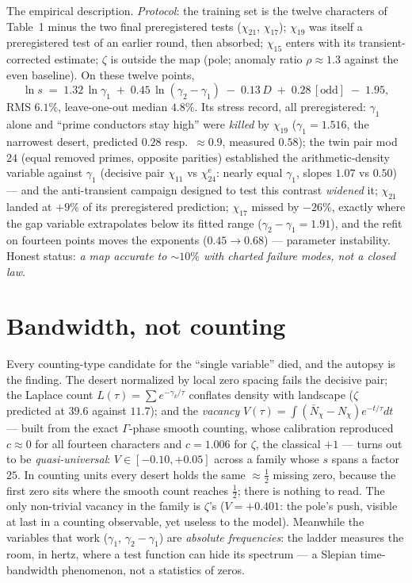 \documentclass[10pt]{article}
\begin{document}
The empirical description. \emph{Protocol}: the training set is the
twelve characters of Table~1 minus the two final preregistered tests
($\chi_{21}$, $\chi_{17}$); $\chi_{19}$ was itself a preregistered
test of an earlier round, then absorbed; $\chi_{15}$ enters with its
transient-corrected estimate; $\zeta$ is outside the map (pole;
anomaly ratio $\rho\approx1.3$ against the even baseline). On these
twelve points,
\[
\ln s \;=\; 1.32\,\ln\gamma_1 \;+\; 0.45\,\ln(\gamma_2-\gamma_1)
\;-\;0.13\,D\;+\;0.28\,[\text{odd}]\;-\;1.95,
\]
RMS $6.1\%$, leave-one-out median $4.8\%$. Its stress record, all
preregistered: $\gamma_1$ alone and ``prime conductors stay high'' were
\emph{killed} by $\chi_{19}$ ($\gamma_1=1.516$, the narrowest desert,
predicted $0.28$ resp.\ $\approx0.9$, measured $0.58$); the twin pair
mod $24$ (equal removed primes, opposite parities) established the
arithmetic-density variable against $\gamma_1$ (decisive pair
$\chi_{11}$ vs $\chi_{24}^{\mathrm e}$: nearly equal $\gamma_1$, slopes
$1.07$ vs $0.50$) --- and the anti-transient campaign designed to test
this contrast \emph{widened} it; $\chi_{21}$ landed at $+9\%$ of its
preregistered prediction; $\chi_{17}$ missed by $-26\%$, exactly where
the gap variable extrapolates below its fitted range
($\gamma_2-\gamma_1=1.91$), and the refit on fourteen points moves the
exponents ($0.45\to0.68$) --- parameter instability. Honest status:
\emph{a map accurate to $\sim\!10\%$ with charted failure modes, not a
closed law}.

\section{Bandwidth, not counting}

Every counting-type candidate for the ``single variable'' died, and the
autopsy is the finding. The desert normalized by local zero spacing
fails the decisive pair; the Laplace count $L(\tau)=\sum e^{-\gamma_k/\tau}$
conflates density with landscape ($\zeta$ predicted at $39.6$ against
$11.7$); and the \emph{vacancy} $V(\tau)=\int(\bar N_\chi-N_\chi)
e^{-t/\tau}dt$ --- built from the exact $\Gamma$-phase smooth counting,
whose calibration reproduced $c\approx0$ for all fourteen characters and
$c=1.006$ for $\zeta$, the classical $+1$ --- turns out to be
\emph{quasi-universal}: $V\in[-0.10,+0.05]$ across a family whose $s$
spans a factor $25$. In counting units every desert holds the same
$\approx\tfrac12$ missing zero, because the first zero sits where the
smooth count reaches $\tfrac12$; there is nothing to read. The only
non-trivial vacancy in the family is $\zeta$'s ($V=+0.401$: the pole's
push, visible at last in a counting observable, yet useless to the
model). Meanwhile the variables that work ($\gamma_1$,
$\gamma_2-\gamma_1$) are \emph{absolute frequencies}: the ladder measures
the room, in hertz, where a test function can hide its spectrum --- a
Slepian time-bandwidth phenomenon, not a statistics of zeros.
\end{document}
